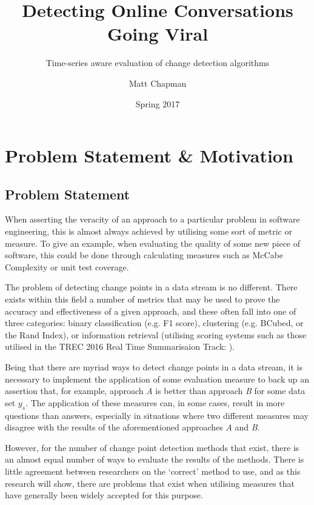 \documentclass{uvamscse}	%
\title{Detecting Online Conversations Going Viral}
\subtitle{Time-series aware evaluation of change detection algorithms}
\date{Spring 2017}
\author{Matt Chapman}
\begin{document}
\nocite{*}
\maketitle


\chapter{Problem Statement \& Motivation}

\section{Problem Statement}
\label{Problem Statement}

When asserting the veracity of an approach to a particular problem in software engineering, this is almost always achieved by utilising some sort of metric or measure. To give an example, when evaluating the quality of some new piece of software, this could be done through calculating measures such as McCabe Complexity \cite{ThomasJ.McCabe1976} or unit test coverage.

The problem of detecting change points in a data stream is no different. There exists within this field a number of metrics that may be used to prove the accuracy and effectiveness of a given approach, and these often fall into one of three categories: binary classification (e.g. F1 score), clustering (e.g. BCubed, or the Rand Index), or information retrieval (utilising scoring systems such as those utilised in the TREC 2016 Real Time Summarisaion Track: \cite{trec2016}).

Being that there are myriad ways to detect change points in a data stream, it is necessary to implement the application of some evaluation measure to back up an assertion that, for example, approach \emph{A} is better than approach \emph{B} for some data set $y_s$. The application of these measures can, in some cases, result in more questions than answers, especially in situations where two different measures may disagree with the results of the aforementioned approaches \emph{A} and \emph{B}.

However, for the number of change point detection methods that exist, there is an almost equal number of ways to evaluate the results of the methods. There is little agreement between researchers on the `correct' method to use, and as this research will show, there are problems that exist when utilising measures that have generally been widely accepted for this purpose.
\end{document}
